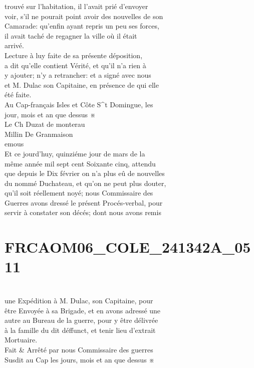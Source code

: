 \documentclass{article}
\begin{document}
\begin{pages}
trouvé sur l'habitation, il l'avait prié d'envoyer\\
voir, s'il ne pourait point avoir des nouvelles de son\\
Camarade: qu'enfin ayant repris un peu ses forces,\\
il avait taché de regagner la ville où il était\\
arrivé.\\
Lecture à luy faite de sa présente déposition,\\
a dit qu'elle contient Vérité, et qu'il n'a rien à\\
y ajouter; n'y a retrancher: et a signé avec nous\\
et M. Dulac son Capitaine, en présence de qui elle\\
été faite.\\
Au Cap-français Isles et Côte S\^{}t Domingue, les\\
jour, mois et an que dessus ※\\
Le Ch Duzat de monterau\\
Millin De Granmaison\\
emous\\
Et ce jourd'huy, quinziéme jour de mars de la\\
même année mil sept cent Soixante cinq, attendu\\
que depuis le Dix février on n'a plus eû de nouvelles\\
du nommé Duchateau, et qu'on ne peut plus douter,\\
qu'il soit réellement noyé; nous Commissaire des\\
Guerres avons dressé le présent Procés-verbal, pour\\
servir à constater son décés; dont nous avons remis
\pend
\endnumbering\beginnumbering\section{FRCAOM06\_COLE\_241342A\_0511}\pstart
\\
une Expédition à M. Dulac, son Capitaine, pour\\
être Envoyée à sa Brigade, et en avons adressé une\\
autre au Bureau de la guerre, pour y être délivrée\\
à la famille du dit déffunct, et tenir lieu d'extrait\\
Mortuaire.\\
Fait \& Arrêté par nous Commissaire des guerres\\
Susdit au Cap les jours, mois et an que dessus ※\\

\end{pages}
\end{document}
